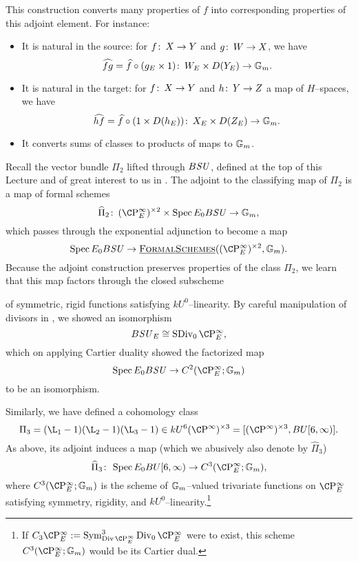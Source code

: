 \begin{remark}
This construction converts many properties of \(f\) into corresponding properties of this adjoint element.  For instance:
\begin{itemize}
    \item It is natural in the source: for \(f\colon\thinspace X \to Y\) and \(g\colon\thinspace W \to X\), we have \[\widehat{fg} = \widehat{f} \circ (g_E \times 1)\colon\thinspace W_E \times D(Y_E) \to \mathbb G_m.\]
    \item It is natural in the target: for \(f\colon\thinspace X \to Y\) and \(h\colon\thinspace Y \to Z\) a map of \(H\)--spaces, we have \[\widehat{hf} = \widehat{f} \circ (1 \times D(h_E))\colon\thinspace X_E \times D(Z_E) \to \mathbb G_m.\]
    \item It converts sums of classes to products of maps to \(\mathbb G_m\).
\end{itemize}
\end{remark}

\begin{example}\label{AdjointBSUExample}
Recall the vector bundle \(\Pi_2\) lifted through \(B\mathit{SU}\), defined at the top of this Lecture and of great interest to us in .  The adjoint to the classifying map of \(\Pi_2\) is a map of formal schemes \[\widehat \Pi_2\co (\CP^\infty_E)^{\times 2} \times \Spec E_0 B\SU \to \Gm,\] which passes through the exponential adjunction to become a map \[\Spec E_0 B\SU \to \InternalHom{FormalSchemes}((\CP^\infty_E)^{\times 2}, \Gm).\]  Because the adjoint construction preserves properties of the class \(\Pi_2\), we learn that this map factors through the closed subscheme
\begin{center}
\end{center}
of symmetric, rigid functions satisfying \(kU^0\)--linearity.  By careful manipulation of divisors in , we showed an isomorphism \[B\SU_E \cong \SDiv_0 \CP^\infty_E,\] which on applying Cartier duality showed the factorized map \[\Spec E_0 B\SU \to C^2(\CP^\infty_E; \Gm)\] to be an isomorphism.
\end{example}

\begin{example}
Similarly, we have defined a cohomology class \[\Pi_3 = (\L_1 - 1)(\L_2 - 1)(\L_3 - 1) \in kU^6(\CP^\infty)^{\times 3} = [(\CP^\infty)^{\times 3}, BU[6, \infty)].\]  As above, its adjoint induces a map (which we abusively also denote by \(\widehat \Pi_3\)) \[\widehat \Pi_3\co \Spec E_0 BU[6, \infty) \to C^3(\CP^\infty_E; \Gm),\] where \(C^3(\CP^\infty_E; \Gm)\) is the scheme of \(\mathbb G_m\)--valued trivariate functions on \(\CP^\infty_E\) satisfying symmetry, rigidity, and \(kU^0\)--linearity.\footnote{If \(C_3 \CP^\infty_E := \Sym^3_{\Div \CP^\infty_E} \Div_0 \CP^\infty_E\) were to exist, this scheme \(C^3(\CP^\infty_E; \Gm)\) would be its Cartier dual.}
\end{example}

